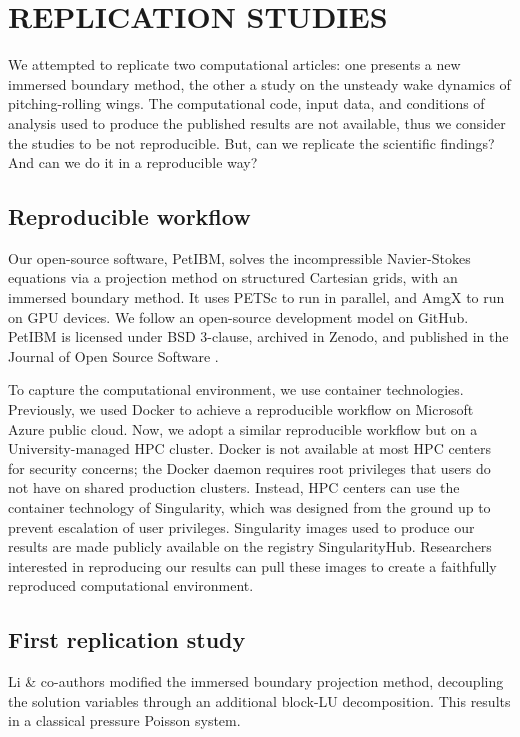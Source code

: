 \documentclass{parcfd}
\begin{document}
\section{REPLICATION STUDIES}

We attempted to replicate two computational articles: one presents a new immersed boundary method, the other a study on the unsteady wake dynamics of pitching-rolling wings.
The computational code, input data, and conditions of analysis used to produce the published results are not available, thus we consider the studies to be not reproducible.
But, can we replicate the scientific findings? And can we do it in a reproducible way?

\subsection{Reproducible workflow}

Our open-source software, PetIBM, solves the incompressible Navier-Stokes equations via a projection method on structured Cartesian grids, with an immersed boundary method.
It uses PETSc to run in parallel, and AmgX to run on GPU devices.
We follow an open-source development model on GitHub.
PetIBM is licensed under BSD 3-clause, archived in Zenodo, and published in the Journal of Open Source Software \cite{chuang_et_al_2018}.

To capture the computational environment, we use container technologies.
Previously, we used Docker to achieve a reproducible workflow on Microsoft Azure \cite{mesnard_barba_2020} public cloud.
Now, we adopt a similar reproducible workflow but on a University-managed HPC cluster.
Docker is not available at most HPC centers for security concerns; the Docker daemon requires root privileges that users do not have on shared production clusters.
Instead, HPC centers can use the container technology of Singularity, which was designed from the ground up to prevent escalation of user privileges.
Singularity images used to produce our results are made publicly available on the registry SingularityHub.
Researchers interested in reproducing our results can pull these images to create a faithfully reproduced computational environment.

\subsection{First replication study}

Li \& co-authors \cite{li_et_al_2016} modified the immersed boundary projection method, decoupling the solution variables through an additional block-LU decomposition.
This results in a classical pressure Poisson system.
\end{document}
